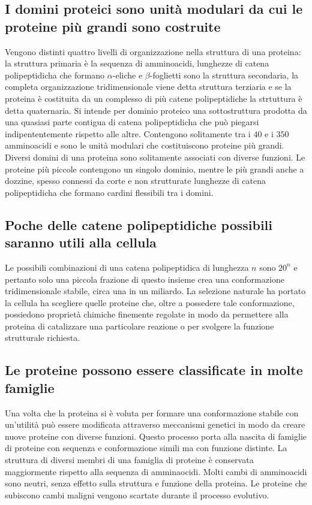 \subsection{I domini proteici sono unit\`a modulari da cui le proteine pi\`u grandi sono costruite}
Vengono distinti quattro livelli di organizzazione nella struttura di una proteina: la struttura primaria \`e la sequenza di amminoacidi, lunghezze di
catena polipeptidicha che formano $\alpha$-eliche e $\beta$-foglietti sono la struttura secondaria, la completa organizzazione tridimensionale viene
detta struttura terziaria e se la proteina \`e costituita da un complesso di pi\`u catene polipeptidiche la strtuttura \`e detta quaternaria. Si intende
per dominio proteico una sottostruttura prodotta da una quasiasi parte contigua di catena polipeptidicha che pu\`o piegarsi indipententemente rispetto 
alle altre. Contengono solitamente tra i $40$ e i $350$ amminoacidi e sono le unit\`a modulari che costituiscono proteine pi\`u grandi. Diversi domini di
una proteina sono solitamente associati con diverse funzioni. Le proteine pi\`u piccole contengono un singolo dominio, mentre le pi\`u grandi anche a
dozzine, spesso connessi da corte e non strutturate lunghezze di catena polipeptidicha che formano cardini flessibili tra i domini.
\subsection{Poche delle catene polipeptidiche possibili saranno utili alla cellula} 
Le possibili combinazioni di una catena polipeptidica di lunghezza $n$ sono $20^n$ e pertanto solo una piccola frazione di questo insieme crea una conformazione tridimensionale stabile, 
circa una in un miliardo. La selezione naturale ha portato la cellula ha scegliere quelle proteine che, oltre a possedere tale conformazione, possiedono propriet\`a chimiche finemente
regolate in modo da permettere alla proteina di catalizzare una particolare reazione o per svolgere la funzione strutturale richiesta. 
\subsection{Le proteine possono essere classificate in molte famiglie}
Una volta che la proteina si \`e voluta per formare una conformazione stabile con un'utilit\`a pu\`o essere modificata attraverso meccanismi genetici in modo da creare nuove proteine
con diverse funzioni. Questo processo porta alla nascita di famiglie di proteine con sequenza e conformazione simili ma con funzione distinte. La struttura di diversi membri di una 
famiglia di proteine \`e conservata maggiormente rispetto alla sequenza di amminaocidi. Molti cambi di amminoacidi sono neutri, senza effetto sulla struttura e funzione della proteina.
Le proteine che subiscono cambi maligni vengono scartate durante il processo evolutivo. 
